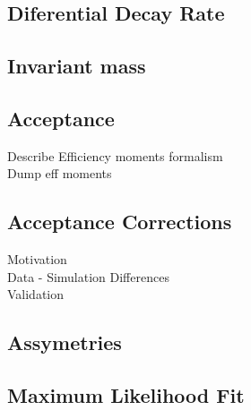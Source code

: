 
\subsection{Diferential Decay Rate}
\subsection{\Kpi Invariant mass}
\subsection{Acceptance}

Describe Efficiency moments formalism\\
Dump eff moments\\

\subsection{Acceptance Corrections}
Motivation\\
Data - Simulation Differences\\
Validation\\
\subsection{\CP Assymetries}
\subsection{Maximum Likelihood Fit}
